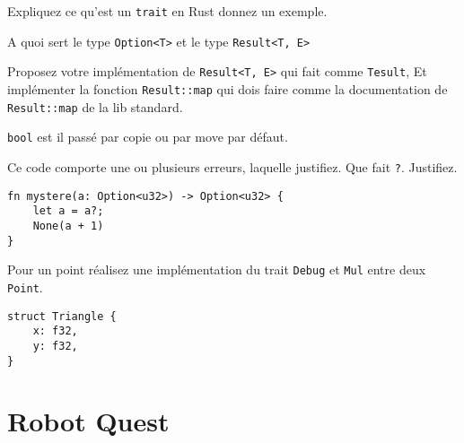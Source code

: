 \documentclass[11pt,a4paper,addpoint]{exam}
\begin{document}
\begin{questions}
\question[1] Expliquez ce qu'est un \texttt{trait} en Rust donnez un exemple.
\vspace{1in}


\question[1] A quoi sert le type \texttt{Option<T>} et le type \texttt{Result<T, E>}
\vspace{1in}

\question[1] Proposez votre implémentation de \texttt{Result<T, E>} qui fait comme \texttt{Tesult},
Et implémenter la fonction \texttt{Result::map} qui dois faire comme la documentation de \texttt{Result::map}
de la lib standard.
\vspace{3in}

\question[1] \texttt{bool} est il passé par copie ou par move par défaut.
\vspace{1in}

\question[1] Ce code comporte une ou plusieurs erreurs, laquelle justifiez. Que fait \texttt{?}. Justifiez.
\begin{verbatim}
fn mystere(a: Option<u32>) -> Option<u32> {
    let a = a?;
    None(a + 1)
}
\end{verbatim}
\vspace{1.5in}

\question[1] Pour un point réalisez une implémentation du trait \texttt{Debug} et \texttt{Mul} entre deux \texttt{Point}.
\begin{verbatim}
struct Triangle {
    x: f32,
    y: f32,
}

\end{verbatim}

\section{Robot Quest}


\end{questions}
\end{document}
